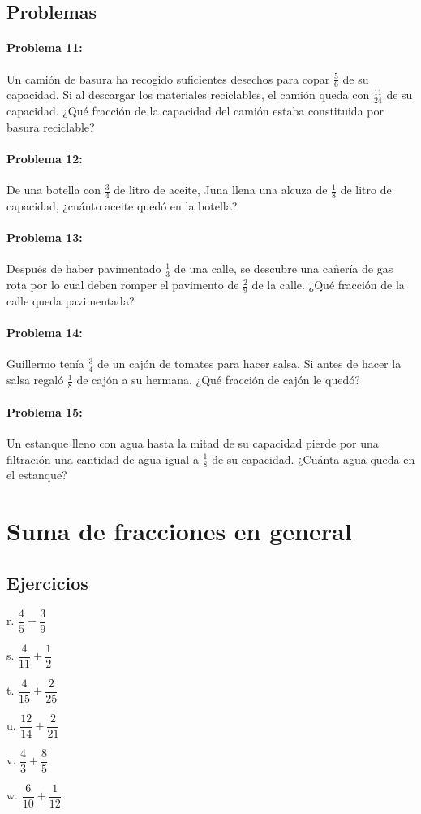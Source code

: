 \documentclass[10pt,twoside]{article}
\begin{document}
\subsection*{Problemas}
\paragraph*{Problema 11:} Un camión de basura ha recogido suficientes desechos para copar $\frac{5}{6}$ de su capacidad. Si al descargar los materiales reciclables, el camión queda con $\frac{11}{24}$ de su capacidad. ¿Qué fracción de la capacidad del camión estaba constituida por basura reciclable?
\paragraph*{Problema 12:} De una botella con $\frac{3}{4}$ de litro de aceite, Juna llena una alcuza de $\frac{1}{8}$ de litro de capacidad, ¿cuánto aceite quedó en la botella?
\paragraph*{Problema 13:} Después de haber pavimentado $\frac{1}{3}$ de una calle, se descubre una cañería de gas rota por lo cual deben romper el pavimento de $\frac{2}{9}$ de la calle. ¿Qué fracción de la calle queda pavimentada?
\paragraph*{Problema 14:} Guillermo tenía $\frac{3}{4}$ de un cajón de tomates para hacer salsa. Si antes de hacer la salsa regaló $\frac{1}{8}$ de cajón a su hermana. ¿Qué fracción de cajón le quedó?
\paragraph*{Problema 15:} Un estanque lleno con agua hasta la mitad de su capacidad pierde por una filtración una cantidad de agua igual a $\frac{1}{8}$ de su capacidad. ¿Cuánta agua queda en el estanque?
\section*{Suma de fracciones en general}
\subsection*{Ejercicios}
\begin{enumerate}
\begin{multicols}{3}
\item[r.] $\dfrac{4}{5}+\dfrac{3}{9}$
\item[s.] $\dfrac{4}{11}+\dfrac{1}{2}$
\item[t.] $\dfrac{4}{15}+\dfrac{2}{25}$
\item[u.] $\dfrac{12}{14}+\dfrac{2}{21}$
\item[v.] $\dfrac{4}{3}+\dfrac{8}{5}$
\item[w.] $\dfrac{6}{10}+\dfrac{1}{12}$
\end{multicols}
\end{enumerate}
\end{document}
